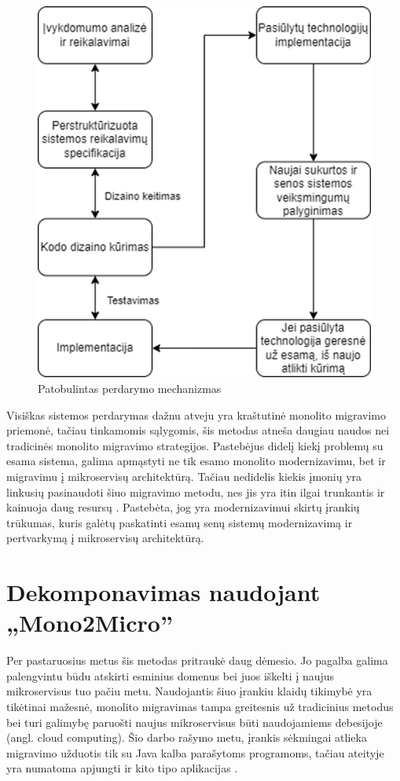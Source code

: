 \documentclass[fleqn]{VUMIFPSkursinis}
\begin{document}
\begin{figure}[H]
    \centering
    \includegraphics{img/patobulintas-perdarymas.png}
    \caption{Patobulintas perdarymo mechanizmas \cite{MQO18}}
    \label{img:patobulintas-perdarymas}
\end{figure}

Visiškas sistemos perdarymas dažnu atveju yra kraštutinė monolito migravimo priemonė, tačiau tinkamomis sąlygomis, šis metodas atneša daugiau naudos nei tradicinės monolito migravimo strategijos. Pastebėjus didelį kiekį problemų su esama sistema, galima apmąstyti ne tik esamo monolito modernizavimu, bet ir migravimu į mikroservisų architektūrą. Tačiau nedidelis kiekis įmonių yra linkusių pasinaudoti šiuo migravimo metodu, nes jis yra itin ilgai trunkantis ir kainuoja daug resursų \cite{MQO18}. Pastebėta, jog yra modernizavimui skirtų įrankių trūkumas, kuris galėtų paskatinti esamų senų sistemų modernizavimą ir pertvarkymą į mikroservisų architektūrą.

\section{Dekomponavimas naudojant „Mono2Micro”}
Per pastaruosius metus šis metodas pritraukė daug dėmesio. Jo pagalba galima palengvintu būdu atskirti esminius domenus bei juos iškelti į naujus mikroservisus tuo pačiu metu. Naudojantis šiuo įrankiu klaidų tikimybė yra tikėtinai mažesnė, monolito migravimas tampa greitesnis už tradicinius metodus bei turi galimybę paruošti naujus mikroservisus būti naudojamiems debesijoje (angl. cloud computing). Šio darbo rašymo metu, įrankis sėkmingai atlieka migravimo užduotis tik su Java kalba parašytoms programoms, tačiau ateityje yra numatoma apjungti ir kito tipo aplikacijas \cite{KXL+20}.
\end{document}
